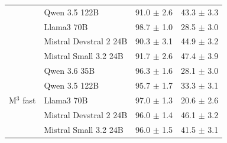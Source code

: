 \begin{table}
\begin{tabular}{llcc}
 & Qwen 3.5 122B & 91.0 $\pm$ 2.6 & 43.3 $\pm$ 3.3 \\
 & Llama3 70B & 98.7 $\pm$ 1.0 & 28.5 $\pm$ 3.0 \\
 & Mistral Devstral 2 24B & 90.3 $\pm$ 3.1 & 44.9 $\pm$ 3.2 \\
 & Mistral Small 3.2 24B & 91.7 $\pm$ 2.6 & 47.4 $\pm$ 3.9 \\
\midrule
\multirow[t]{5}{*}{M$^3$ fast} & Qwen 3.6 35B & 96.3 $\pm$ 1.6 & 28.1 $\pm$ 3.0 \\
 & Qwen 3.5 122B & 95.7 $\pm$ 1.7 & 33.3 $\pm$ 3.1 \\
 & Llama3 70B & 97.0 $\pm$ 1.3 & 20.6 $\pm$ 2.6 \\
 & Mistral Devstral 2 24B & 96.0 $\pm$ 1.4 & 46.1 $\pm$ 3.2 \\
 & Mistral Small 3.2 24B & 96.0 $\pm$ 1.5 & 41.5 $\pm$ 3.1 \\
\bottomrule
\end{tabular}
\end{table}
